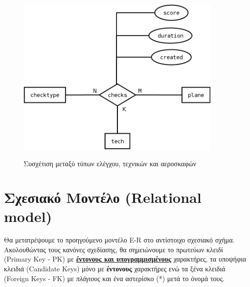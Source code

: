 \documentclass[a4paper]{article}
\begin{document}
\begin{figure}[h]
\centering
\includegraphics[width=0.9\textwidth]{../../ER_model/aviation_relations_2.png}\\
\caption{Συσχέτιση μεταξύ τύπων ελέγχου, τεχνικών και αεροσκαφών}
\end{figure}
\pagebreak


\section{Σχεσιακό Μοντέλο  (Relational model)}
Θα μετατρέψουμε το προηγούμενο μοντέλο E-R στο αντίστοιχο σχεσιακό σχήμα.
Ακολουθώντας τους κανόνες σχεδίασης, θα σημειώνουμε το πρωτεύων κλειδί
(Primary Key - PK) με  \underline{\textbf{έντονους και υπογραμμισμένους}} χαρακτήρες,
τα υποψήφια κλειδιά (Candidate Keys) μόνο με \textbf{έντονους}
χαρακτήρες ενώ τα ξένα κλειδιά (Foreign Keys - FK) με \textit{πλάγιους} και ένα αστερίσκο (*) μετά
το όνομά τους.\\
\end{document}

